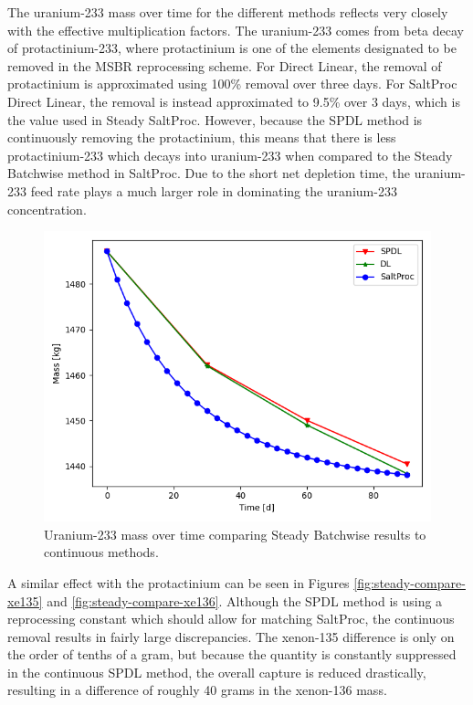 The uranium-233 mass over time for the different methods reflects very closely with the effective multiplication factors. The uranium-233 comes from beta decay of protactinium-233, where protactinium is one of the elements designated to be removed in the MSBR reprocessing scheme. For Direct Linear, the removal of protactinium is approximated using 100\% removal over three days. For SaltProc Direct Linear, the removal is instead approximated to 9.5\% over 3 days, which is the value used in Steady SaltProc. However, because the SPDL method is continuously removing the protactinium, this means that there is less protactinium-233 which decays into uranium-233 when compared to the Steady Batchwise method in SaltProc. Due to the short net depletion time, the uranium-233 feed rate plays a much larger role in dominating the uranium-233 concentration.

\begin{figure}[H]
  \centering
  \includegraphics[scale=0.7]{images/soln-1-2-u233.png}
  \caption{Uranium-233 mass over time comparing Steady Batchwise results to continuous methods.}
   \label{fig:steady-compare-u233}
\end{figure}

A similar effect with the protactinium can be seen in Figures \ref{fig:steady-compare-xe135} and \ref{fig:steady-compare-xe136}. Although the SPDL method is using a reprocessing constant which should allow for matching SaltProc, the continuous removal results in fairly large discrepancies. The xenon-135 difference is only on the order of tenths of a gram, but because the quantity is constantly suppressed in the continuous SPDL method, the overall capture is reduced drastically, resulting in a difference of roughly 40 grams in the xenon-136 mass.

